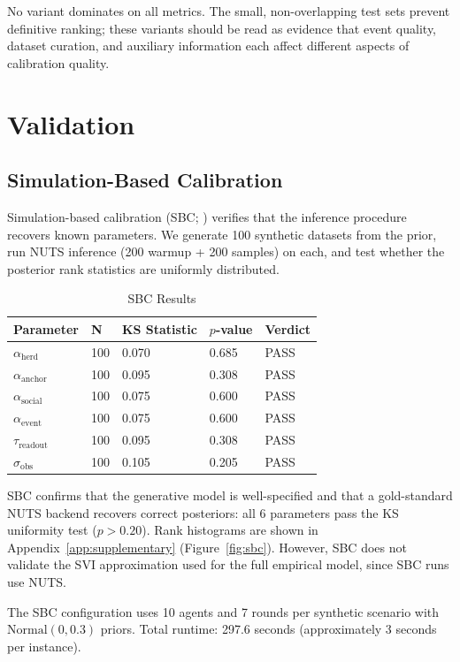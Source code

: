\documentclass[12pt]{article}
\begin{document}
No variant dominates on all metrics. The small, non-overlapping test sets prevent definitive ranking; these variants should be read as evidence that event quality, dataset curation, and auxiliary information each affect different aspects of calibration quality.

\section{Validation}
\label{sec:validation}

\subsection{Simulation-Based Calibration}

Simulation-based calibration (SBC; \citealp{talts2018}) verifies that the inference procedure recovers known parameters. We generate 100 synthetic datasets from the prior, run NUTS inference (200 warmup + 200 samples) on each, and test whether the posterior rank statistics are uniformly distributed.

\begin{table}[H]
\centering
\caption{SBC Results}
\label{tab:sbc}
\begin{tabular}{lllll}
\toprule
Parameter & N & KS Statistic & $p$-value & Verdict \\
\midrule
$\alpha_{\text{herd}}$ & 100 & 0.070 & 0.685 & PASS \\
$\alpha_{\text{anchor}}$ & 100 & 0.095 & 0.308 & PASS \\
$\alpha_{\text{social}}$ & 100 & 0.075 & 0.600 & PASS \\
$\alpha_{\text{event}}$ & 100 & 0.075 & 0.600 & PASS \\
$\tau_{\text{readout}}$ & 100 & 0.095 & 0.308 & PASS \\
$\sigma_{\text{obs}}$ & 100 & 0.105 & 0.205 & PASS \\
\bottomrule
\end{tabular}
\end{table}

SBC confirms that the generative model is well-specified and that a gold-standard NUTS backend recovers correct posteriors: all 6 parameters pass the KS uniformity test ($p > 0.20$). Rank histograms are shown in Appendix~\ref{app:supplementary} (Figure~\ref{fig:sbc}). However, SBC does not validate the SVI approximation used for the full empirical model, since SBC runs use NUTS.

The SBC configuration uses 10 agents and 7 rounds per synthetic scenario with $\text{Normal}(0, 0.3)$ priors. Total runtime: 297.6 seconds (approximately 3 seconds per instance).
\end{document}
